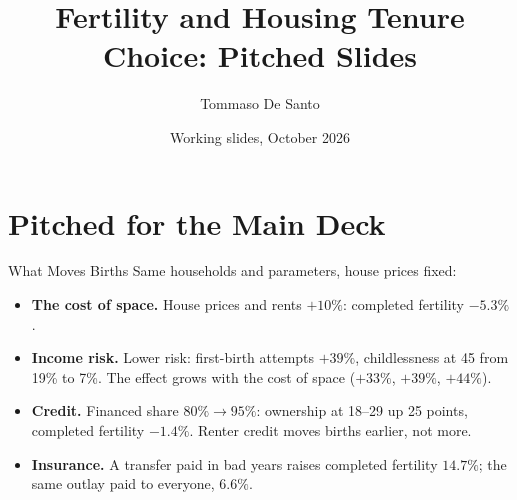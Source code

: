 
\title{Fertility and Housing Tenure Choice: Pitched Slides}
\author{Tommaso De Santo}
\date{Working slides, October 2026}

{
\maketitle
}
\section{Pitched for the Main Deck}
\begin{frame}{What Moves Births}
\small
Same households and parameters, house prices fixed:
\begin{itemize}\setlength\itemsep{0.7em}
  \item \textbf{The cost of space.} House prices and rents $+10\%$: completed fertility $-5.3\%$.
  \item \textbf{Income risk.} Lower risk: first-birth attempts $+39\%$, childlessness at 45 from 19\% to 7\%. The effect grows with the cost of space ($+33\%$, $+39\%$, $+44\%$).
  \item \textbf{Credit.} Financed share $80\%\to95\%$: ownership at 18--29 up 25 points, completed fertility $-1.4\%$. Renter credit moves births earlier, not more.
  \item \textbf{Insurance.} A transfer paid in bad years raises completed fertility $14.7\%$; the same outlay paid to everyone, $6.6\%$.
\end{itemize}
\end{frame}

